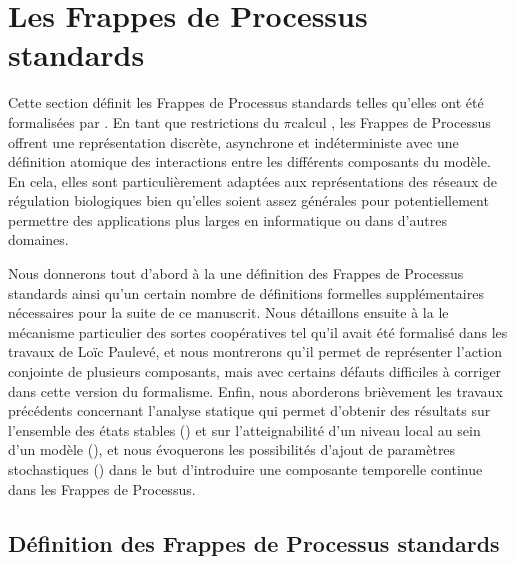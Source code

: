 \section{Les Frappes de Processus standards}

Cette section définit les Frappes de Processus standards
telles qu'elles ont été formalisées par .
En tant que restrictions du $\pi$\nbd calcul \cite{Brand83,Milner89},
les Frappes de Processus offrent une représentation discrète, asynchrone et indéterministe
avec une définition atomique des interactions entre les différents composants du modèle.
En cela,
elles sont particulièrement adaptées aux représentations des réseaux de régulation biologiques
bien qu'elles soient assez générales pour potentiellement permettre des applications plus
larges en informatique ou dans d'autres domaines.

Nous donnerons tout d'abord à la  une définition des Frappes de Processus standards
ainsi qu'un certain nombre de définitions formelles supplémentaires
nécessaires pour la suite de ce manuscrit.
Nous détaillons ensuite à la  le mécanisme particulier des sortes coopératives
tel qu'il avait été formalisé dans les travaux de Loïc Paulevé,
et nous montrerons qu'il permet de représenter l'action conjointe de plusieurs composants,
mais avec certains défauts difficiles à corriger dans cette version du formalisme.
Enfin, nous aborderons brièvement les travaux précédents
concernant l'analyse statique qui permet d'obtenir des résultats
sur l'ensemble des états stables ()
et sur l'atteignabilité d'un niveau local au sein d'un modèle (),
et nous évoquerons les possibilités d'ajout de paramètres stochastiques ()
dans le but d'introduire une composante temporelle continue dans les Frappes de Processus.



\subsection{Définition des Frappes de Processus standards}

